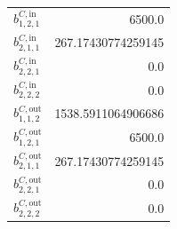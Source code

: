 \documentclass{article}%
\begin{document}
\begin{multicols*}{3}
\begin{supertabular}{lr}
	$b_{1,2,1}^{C,\text{in}}$ & 6500.0 \\%
	$b_{2,1,1}^{C,\text{in}}$ & 267.17430774259145 \\%
	$b_{2,2,1}^{C,\text{in}}$ & 0.0 \\%
	$b_{2,2,2}^{C,\text{in}}$ & 0.0 \\%
	$b_{1,1,2}^{C,\text{out}}$ & 1538.5911064906686 \\%
	$b_{1,2,1}^{C,\text{out}}$ & 6500.0 \\%
	$b_{2,1,1}^{C,\text{out}}$ & 267.17430774259145 \\%
	$b_{2,2,1}^{C,\text{out}}$ & 0.0 \\%
	$b_{2,2,2}^{C,\text{out}}$ & 0.0 \\%
\end{supertabular}%
\end{multicols*}%
\end{document}
